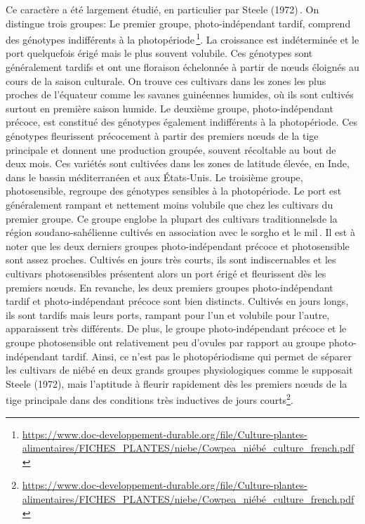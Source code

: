 \documentclass[a4paper,11pt]{article}
\begin{document}
Ce caractère a été largement étudié, en particulier par Steele
(1972)\,\cite{Steele_1972}. On distingue trois groupes: Le premier groupe,
photo-indépendant tardif, comprend des génotypes indifférents à la
photopériode\,\footnote{\url{https://www.doc-developpement-durable.org/file/Culture-plantes-alimentaires/FICHES_PLANTES/niebe/Cowpea_niébé_culture_french.pdf}}. La
croissance est indéterminée et le port quelquefois érigé mais le plus
souvent volubile. Ces génotypes sont généralement tardifs et ont une
floraison échelonnée à partir de nœuds éloignés au cours de la saison
culturale. On trouve ces cultivars dans les zones les plus proches de
l’équateur comme les savanes guinéennes humides, où ils sont cultivés
surtout en première saison humide.  Le deuxième groupe,
photo-indépendant précoce, est constitué des génotypes également
indifférents à la photopériode. Ces génotypes fleurissent précocement
à partir des premiers nœuds de la tige principale et donnent une
production groupée, souvent récoltable au bout de deux mois. Ces
variétés sont cultivées dans les zones de latitude élevée, en Inde,
dans le bassin méditerranéen et aux États-Unis.  Le troisième groupe,
photosensible, regroupe des génotypes sensibles à la photopériode. Le
port est généralement rampant et nettement moins volubile que chez les
cultivars du premier groupe. Ce groupe englobe la plupart des
cultivars traditionnelsde la région soudano-sahélienne cultivés en
association avec le sorgho et le mil\,\cite{Doggett_1988}. Il est à
noter que les deux derniers groupes photo-indépendant précoce et
photosensible sont assez proches. Cultivés en jours très courts, ils
sont indiscernables et les cultivars photosensibles présentent alors
un port érigé et fleurissent dès les premiers nœuds. En revanche, les
deux premiers groupes photo-indépendant tardif et photo-indépendant
précoce sont bien distincts. Cultivés en jours longs, ils sont tardifs
mais leurs ports, rampant pour l’un et volubile pour l’autre,
apparaissent très différents. De plus, le groupe photo-indépendant
précoce et le groupe photosensible ont relativement peu d’ovules par
rapport au groupe photo-indépendant tardif. Ainsi, ce n’est pas le
photopériodisme qui permet de séparer les cultivars de niébé en deux
grands groupes physiologiques comme le supposait Steele (1972), mais
l’aptitude à fleurir rapidement dès les premiers nœuds de la tige
principale dans des conditions très inductives de jours
courts\footnote{\url{https://www.doc-developpement-durable.org/file/Culture-plantes-alimentaires/FICHES_PLANTES/niebe/Cowpea_niébé_culture_french.pdf}}.
\end{document}
